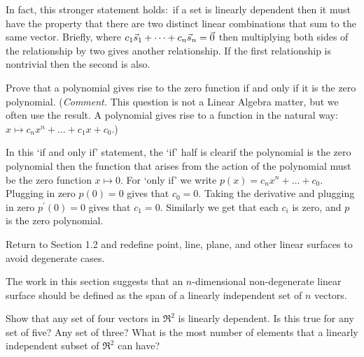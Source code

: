 \begin{exercises}
\begin{answer}
\begin{exparts}
          In fact, this stronger statement holds:~if a set is linearly 
          dependent then it must have the property that there are two 
          distinct linear combinations that sum to the same vector.
          Briefly, where \( c_1\vec{s}_1+\dots+c_n\vec{s}_n=\vec{0} \) then
          multiplying both sides of the relationship by two gives another 
          relationship.
          If the first relationship is nontrivial then the second is also.
      \end{exparts}  
    \end{answer}
  \item  \label{exer:PolyZeroFcnOnlyIfZeroPol}
     Prove that a polynomial gives rise to the zero function if and only if
     it is the zero polynomial.
     (\textit{Comment.}
     This question is not a Linear Algebra matter, but we often use the result.
     A polynomial gives rise to a function in the natural 
     way:~$x\mapsto c_nx^n+\dots+c_1x+c_0$.)
     \begin{answer}
       In this `if and only if' statement, the `if' half is clear\Dash if 
       the polynomial is the zero polynomial then the function that arises 
       from the action of the polynomial must be the zero 
       function $x\mapsto 0$. 
       For `only if' we write $p(x)=c_nx^n+\dots+c_0$. 
       Plugging in zero $p(0)=0$ gives that $c_0=0$.
       Taking the derivative and plugging in zero $p^\prime(0)=0$ gives 
       that $c_1=0$.
       Similarly we get that each $c_i$ is zero, and $p$ is the zero 
       polynomial.
     \end{answer}
  \item
    Return to Section 1.2 and redefine point, line, plane,
    and other linear surfaces to avoid degenerate cases.
    \begin{answer}
      The work in this section suggests that an \( n \)-dimensional
      non-degenerate linear surface should be defined as the span of a linearly
      independent set of \( n \) vectors.  
    \end{answer}
  \item 
    \begin{exparts}  
      \partsitem Show that any set of four vectors in \( \Re^2 \) is 
         linearly dependent.
      \partsitem Is this true for any set of five?
         Any set of three?
      \partsitem What is the most number of elements that a 
         linearly independent subset of $\Re^2$ can have?
    \end{exparts}
    \begin{answer}

\end{answer}
\end{exercises}
